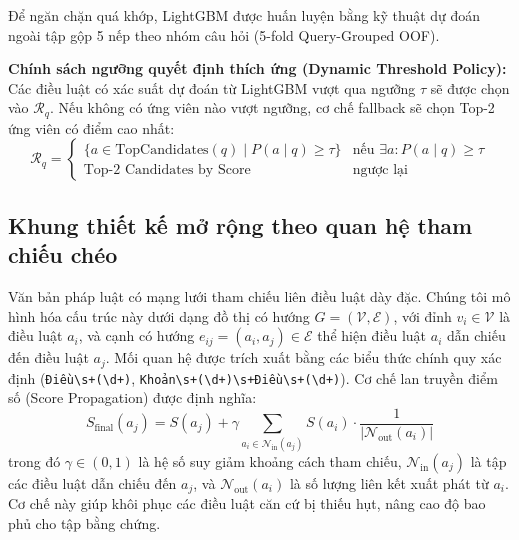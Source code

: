 \documentclass[12pt,a4paper]{article}
\begin{document}
Để ngăn chặn quá khớp, LightGBM được huấn luyện bằng kỹ thuật dự đoán ngoài tập gộp 5 nếp theo nhóm câu hỏi (5-fold Query-Grouped OOF). 

\textbf{Chính sách ngưỡng quyết định thích ứng (Dynamic Threshold Policy):} Các điều luật có xác suất dự đoán từ LightGBM vượt qua ngưỡng $\tau$ sẽ được chọn vào $\mathcal{R}_q$. Nếu không có ứng viên nào vượt ngưỡng, cơ chế fallback sẽ chọn Top-2 ứng viên có điểm cao nhất:
\begin{equation}
\mathcal{R}_q = \begin{cases}
\{a \in \text{TopCandidates}(q) \mid P(a \mid q) \ge \tau\} & \text{nếu } \exists a: P(a \mid q) \ge \tau \\
\text{Top-2 Candidates by Score} & \text{ngược lại}
\end{cases}
\label{eq:threshold_fallback}
\end{equation}

\subsection{Khung thiết kế mở rộng theo quan hệ tham chiếu chéo}
Văn bản pháp luật có mạng lưới tham chiếu liên điều luật dày đặc. Chúng tôi mô hình hóa cấu trúc này dưới dạng đồ thị có hướng $G = (\mathcal{V}, \mathcal{E})$, với đỉnh $v_i \in \mathcal{V}$ là điều luật $a_i$, và cạnh có hướng $e_{ij} = (a_i, a_j) \in \mathcal{E}$ thể hiện điều luật $a_i$ dẫn chiếu đến điều luật $a_j$. Mối quan hệ được trích xuất bằng các biểu thức chính quy xác định (\texttt{Điều\textbackslash s+(\textbackslash d+)}, \texttt{Khoản\textbackslash s+(\textbackslash d+)\textbackslash s+Điều\textbackslash s+(\textbackslash d+)}). Cơ chế lan truyền điểm số (Score Propagation) được định nghĩa:
\begin{equation}
S_{\text{final}}(a_j) = S(a_j) + \gamma \sum_{a_i \in \mathcal{N}_{\text{in}}(a_j)} S(a_i) \cdot \frac{1}{|\mathcal{N}_{\text{out}}(a_i)|}
\label{eq:propagation}
\end{equation}
trong đó $\gamma \in (0, 1)$ là hệ số suy giảm khoảng cách tham chiếu, $\mathcal{N}_{\text{in}}(a_j)$ là tập các điều luật dẫn chiếu đến $a_j$, và $\mathcal{N}_{\text{out}}(a_i)$ là số lượng liên kết xuất phát từ $a_i$. Cơ chế này giúp khôi phục các điều luật căn cứ bị thiếu hụt, nâng cao độ bao phủ cho tập bằng chứng.

\end{document}

